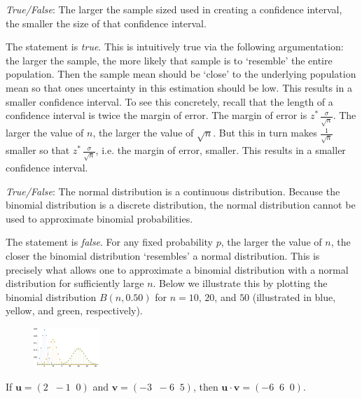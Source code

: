 \documentclass[11pt,letterpaper]{article}
\begin{document}
\quizsol \textit{True/False}: The larger the sample sized used in creating a confidence interval, the smaller the size of that confidence interval. \pspace

\sol The statement is \textit{true}. This is intuitively true via the following argumentation: the larger the sample, the more likely that sample is to `resemble' the entire population. Then the sample mean should be `close' to the underlying population mean so that ones uncertainty in this estimation should be low. This results in a smaller confidence interval. To see this concretely, recall that the length of a confidence interval is twice the margin of error. The margin of error is $z^* \, \frac{\sigma}{\sqrt{n}}$. The larger the value of $n$, the larger the value of $\sqrt{n}$. But this in turn makes $\frac{1}{\sqrt{n}}$ smaller so that $z^* \, \frac{\sigma}{\sqrt{n}}$, i.e. the margin of error, smaller. This results in a smaller confidence interval. \pvspace{1.3cm}



\quizsol \textit{True/False}: The normal distribution is a continuous distribution. Because the binomial distribution is a discrete distribution, the normal distribution cannot be used to approximate binomial probabilities. \pspace

\sol The statement is \textit{false}. For any fixed probability $p$, the larger the value of $n$, the closer the binomial distribution `resembles' a normal distribution. This is precisely what allows one to approximate a binomial distribution with a normal distribution for sufficiently large $n$. Below we illustrate this by plotting the binomial distribution $B(n, 0.50)$ for $n= 10$, $20$, and $50$ (illustrated in blue, yellow, and green, respectively). 
	\begin{figure}[!ht]
	\centering
	\includegraphics[width= 0.22\textwidth]{binomial.png}
	\end{figure}




If $\mathbf{u}= (2 \;\;-1\;\;0)$ and $\mathbf{v}= (-3\;\;-6\;\;5)$, then $\mathbf{u} \cdot \mathbf{v}= (-6\;\;6\;\;0)$. 






\newpage
\end{document}
